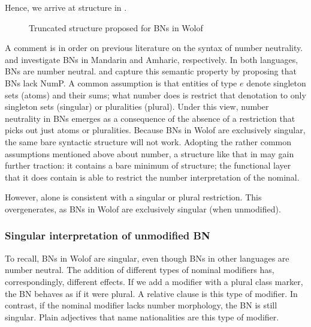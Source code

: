 \documentclass[output=paper]{langscibook}
\begin{document}
Hence, we arrive at structure in .
		
\begin{figure}
    \caption{Truncated structure proposed for BNs in Wolof}
    \label{fon:sTrkTBnbN}
\end{figure}
		
A comment is in order on previous literature on the syntax of number neutrality. \citet{rullmannYou2006} and \citet{kramer2017general} investigate BNs in Mandarin and Amharic, respectively. In both languages, BNs are number neutral. \citeauthor{rullmannYou2006} and \citeauthor{kramer2017general} capture this semantic property by proposing that BNs lack NumP. A common assumption is that entities of type $e$ denote singleton sets (atoms) and their sums; what number does is restrict that denotation to only singleton sets (singular) or pluralities (plural). Under this view, number neutrality in BNs emerges as a consequence of the absence of a restriction that picks out just atoms or pluralities. Because BNs in Wolof are exclusively singular, the same bare syntactic structure will not work. Adopting the rather common assumptions mentioned above about number, a structure like that in  may gain further traction: it contains a bare minimum of structure; the functional layer that it does contain is able to restrict the number interpretation of the nominal.

However,  alone is consistent with a singular or plural restriction. This overgenerates, as BNs in Wolof are exclusively singular (when unmodified).
	
\subsubsection{Singular interpretation of unmodified BN}
\label{fon:seK:anAlzS}


	To recall, BNs in Wolof are singular, even though BNs in other languages are number neutral. The addition of different types of nominal modifiers has, correspondingly, different effects. If we add a modifier with a plural class marker, the BN behaves as if it were plural. A relative clause is this type of modifier. In contrast, if the nominal modifier lacks number morphology, the BN is still singular. Plain adjectives that name nationalities are this type of modifier.
			
\end{document}
